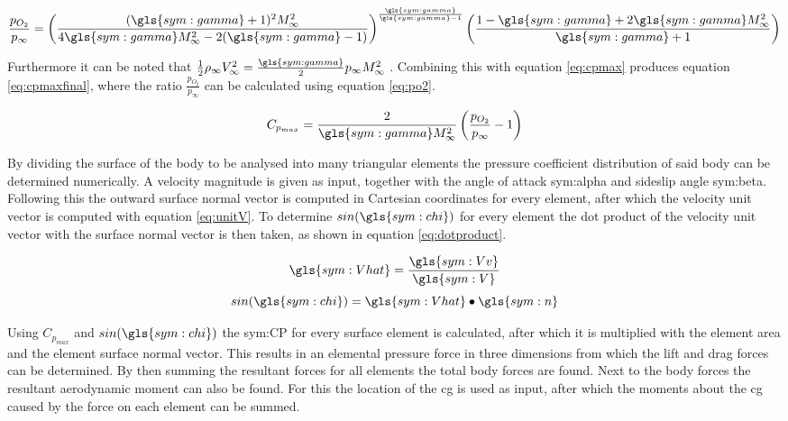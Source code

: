 \begin{equation}
\frac{p_{O_{2}}}{p_{\infty}}=\left(\frac{(\gls{sym:gamma}+1)^{2}M_{\infty}^{2}}{4\gls{sym:gamma} M_{\infty}^{2}-2(\gls{sym:gamma}-1)}\right)^{\frac{\gls{sym:gamma}}{\gls{sym:gamma}-1}}\left(\frac{1-\gls{sym:gamma}+2\gls{sym:gamma} M_{\infty}^{2}}{\gls{sym:gamma}+1}\right)
\label{eq:po2}
\end{equation}

Furthermore it can be noted that $\frac{1}{2}\rho_{\infty}V_{\infty}^{2}=\frac{\gls{sym:gamma}}{2}p_{\infty}M_{\infty}^{2}$ \cite{AndersonJr.2007}. Combining this with equation \ref{eq:cpmax} produces equation \ref{eq:cpmaxfinal}, where the ratio $\frac{p_{O_{2}}}{p_{\infty}}$ can be calculated using equation \ref{eq:po2}.

\begin{equation}
C_{p_{max}}=\frac{2}{\gls{sym:gamma} M_{\infty}^{2}}\left(\frac{p_{O_{2}}}{p_{\infty}}-1\right)
\label{eq:cpmaxfinal}
\end{equation}

By dividing the surface of the body to be analysed into many triangular elements the pressure coefficient distribution of said body can be determined numerically. A velocity magnitude is given as input, together with the angle of attack \gls{sym:alpha} and sideslip angle \gls{sym:beta}. Following this the outward surface normal vector is computed in Cartesian coordinates for every element, after which the velocity unit vector is computed with equation \ref{eq:unitV}. To determine $sin(\gls{sym:chi})$ for every element the dot product of the velocity unit vector with the surface normal vector is then taken, as shown in equation \ref{eq:dotproduct}.
\begin{multicols}{2}
\begin{equation}
\gls{sym:Vhat}=\frac{\gls{sym:Vv}}{\gls{sym:V}}
\label{eq:unitV}
\end{equation} \break
\begin{equation}
sin(\gls{sym:chi})=\gls{sym:Vhat} \bullet \gls{sym:n}
\label{eq:dotproduct}
\end{equation}
\end{multicols}
Using $C_{p_{max}}$ and $sin(\gls{sym:chi})$ the \gls{sym:CP} for every surface element is calculated, after which it is multiplied with the element area and the element surface normal vector. This results in an elemental pressure force in three dimensions from which the lift and drag forces can be determined. By then summing the resultant forces for all elements the total body forces are found. Next to the body forces the resultant aerodynamic moment can also be found. For this the location of the \acrfull{cg} is used as input, after which the moments about the \gls{cg} caused by the force on each element can be summed. 

